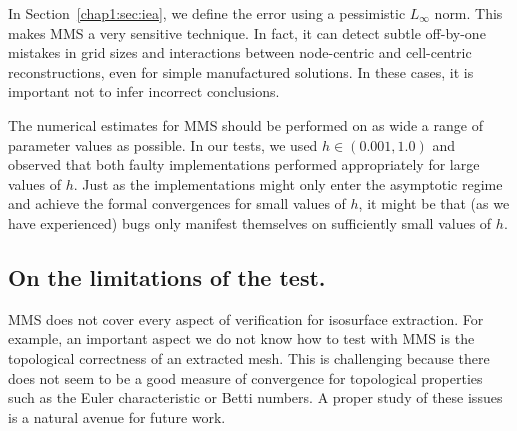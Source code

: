 In Section~\ref{chap1:sec:iea}, we define the error using a pessimistic
$L_\infty$ norm. This makes MMS a very sensitive technique. In
fact, it can detect subtle off-by-one mistakes in grid sizes
and interactions between node-centric and cell-centric
reconstructions,
even for simple manufactured solutions. In
these cases, it is important not to infer incorrect conclusions. 


The numerical estimates for MMS should be performed on as wide a range
of parameter values as possible. In our tests, we used 
$h \in (0.001, 1.0)$ and observed that both faulty implementations
performed appropriately for large values of $h$. Just as the
implementations might only enter the asymptotic regime and achieve the
formal convergences for small values of $h$, it might be that (as we
have experienced) bugs only manifest themselves on sufficiently small
values of $h$.


\subsection{On the limitations of the test.}
MMS does not cover every aspect of verification for
isosurface extraction. For example, an important aspect we do not
know how to test with MMS is the topological correctness of an
extracted mesh. This is challenging because there does not seem to
be a good measure of convergence for topological properties
such as the Euler characteristic or Betti numbers. A proper study of
these issues is a natural avenue for future work.

